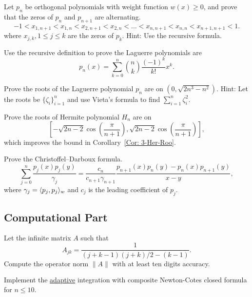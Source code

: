 \begin{problem}[interlacing]
    Let $p_n$ be orthogonal polynomials with weight function $w(x)\ge 0$, and prove that the zeros of $p_n$ and $p_{n+1}$ are alternating. 
    \begin{equation}
        -1 < x_{1, n+1} < x_{1, n} < x_{2,n+1} < x_{2,n}<\dots < x_{n,n+1} < x_{n, n} < x_{n+1, n+1} < 1.
    \end{equation}
    where $x_{j, k}, 1\le j\le k$ are the zeros of $p_k$. Hint: Use the recursive formula.
\end{problem}
\begin{problem}
\label{Prb: 3-Exe-Lag}
    Use the recursive definition to prove the Laguerre polynomials are 
    \begin{equation}
        p_n(x) = \sum_{k=0}^n \binom{n}{k} \frac{(-1)^k}{k!} x^k.
    \end{equation}
\end{problem}
\begin{problem}
\label{Prb: 3-Exe-5}
    Prove the roots of the Laguerre polynomial $p_n$ are on $(0, \sqrt{2n^3 - n^2})$. Hint: Let the roots be $\{\zeta_i\}_{i=1}^n$ and use Vieta's formula to find $\sum_{i=1}^n \zeta_i^2$. 
\end{problem}

\begin{problem}
    Prove the roots of Hermite polynomial $H_n$ are on $$\left[-\sqrt{2n-2}\cos\left(\frac{\pi}{n+1}\right), \sqrt{2n-2}\cos\left(\frac{\pi}{n+1}\right)\right],$$ which improves the bound in Corollary~\ref{Cor: 3-Her-Roo}.
\end{problem}

\begin{problem}
    Prove the Christoffel–Darboux formula. 
    \begin{equation*}
        \sum_{j=0}^n \frac{p_j(x) p_j(y)}{\gamma_j} = \frac{c_{n}}{c_{n+1}\gamma_{n+1}} \frac{p_{n+1}(x)p_n(y) - p_{n}(x)p_{n+1}(y)}{x - y}, 
    \end{equation*}
    where $\gamma_j = \langle {p_j, p_j} \rangle_w$ and $c_j$ is the leading coefficient of $p_j$.
\end{problem}

\subsection{Computational Part}
\begin{problem}
    Let the infinite matrix $A$ such that $$A_{jk} = \frac{1}{(j+k-1)(j+k)/2 - (k-1)}.$$
    Compute the operator norm $\|A\|$ with at least ten digits accuracy.
\end{problem}
\begin{problem}
    Implement the \underline{adaptive} integration with composite Newton-Cotes closed formula for $n \le 10$. 
\end{problem}


